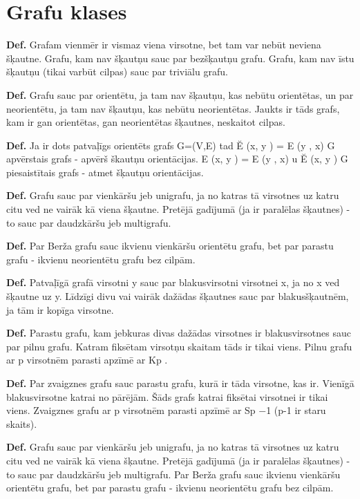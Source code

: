 \documentclass{article}
\begin{document}
\section{Grafu klases}

\textbf{Def.}  Grafam vienmēr ir vismaz viena virsotne, bet tam var nebūt neviena šķautne. Grafu, kam nav šķautņu sauc par bezšķautņu grafu. Grafu, kam nav īstu šķautņu (tikai varbūt cilpas) sauc par triviālu grafu.

\textbf{Def.} Grafu sauc par orientētu, ja tam nav šķautņu, kas nebūtu orientētas, un par neorientētu, ja tam nav šķautņu, kas nebūtu neorientētas.  Jaukts ir tāds grafs, kam ir gan orientētas, gan neorientētas šķautnes, neskaitot cilpas.

\textbf{Def.} Ja ir dots patvaļīgs orientēts grafs G=(V,E) tad Ĕ (x, y ) = E (y , x) G apvērstais grafs - apvērš škautņu orientācijas. E (x, y ) = E (y , x) u Ĕ (x, y ) G piesaistītais grafs - atmet šķautņu orientācijas. 

\textbf{Def.} Grafu sauc par vienkāršu jeb unigrafu, ja no katras tā virsotnes uz katru citu ved ne vairāk kā viena šķautne. Pretējā gadījumā (ja ir paralēlas šķautnes) - to sauc par daudzkāršu jeb multigrafu.

\textbf{Def.} Par Berža grafu sauc ikvienu vienkāršu orientētu grafu, bet par parastu grafu - ikvienu neorientētu grafu bez cilpām.

\textbf{Def.} Patvaļīgā grafā virsotni y sauc par blakusvirsotni virsotnei x, ja no x ved šķautne uz y.
Līdzīgi divu vai vairāk dažādas šķautnes sauc par blakusšķautnēm, ja tām ir kopīga virsotne.

\textbf{Def.} Parastu grafu, kam jebkuras divas dažādas virsotnes ir blakusvirsotnes sauc par pilnu grafu. Katram fiksētam virsotņu skaitam tāds ir tikai viens. Pilnu grafu ar p virsotnēm parasti apzīmē ar Kp .

\textbf{Def.} Par zvaigznes grafu sauc parastu grafu, kurā ir tāda virsotne, kas ir. Vienīgā blakusvirsotne katrai no pārējām.  Šāds grafs katrai fiksētai virsotnei ir tikai viens. Zvaigznes grafu ar p virsotnēm parasti apzīmē ar Sp −1 (p-1 ir staru skaits).

\textbf{Def.}  Grafu sauc par vienkāršu jeb unigrafu, ja no katras tā virsotnes uz katru citu ved ne vairāk kā viena šķautne. Pretējā gadījumā (ja ir paralēlas šķautnes) - to sauc par daudzkāršu jeb multigrafu.  Par Berža grafu sauc ikvienu vienkāršu orientētu grafu, bet par parastu grafu - ikvienu neorientētu grafu bez cilpām.
\end{document}
